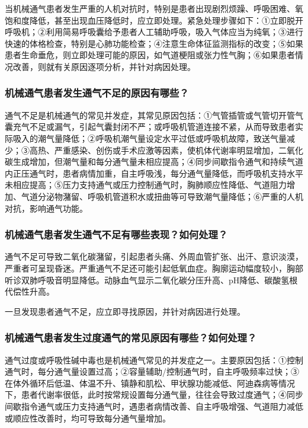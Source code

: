 当机械通气患者发生严重的人机对抗时，特别是患者出现剧烈烦躁、呼吸困难、氧饱和度降低，甚至出现血压降低时，应立即处理。紧急处理步骤如下：①立即脱开呼吸机；②利用简易呼吸囊给予患者人工辅助呼吸，吸入气体应当为纯氧；③进行快速的体格检查，特别是心肺功能检查；④注意生命体征监测指标的改变；⑤如果患者生命垂危，则立即处理可能的原因，如气道梗阻或张力性气胸；⑥如果患者情况改善，则就有关原因逐项分析，并针对病因处理。

\subsubsection{机械通气患者发生通气不足的原因有哪些？}

通气不足是机械通气的常见并发症，其常见原因包括：①气管插管或气管切开管气囊充气不足或漏气，引起气囊封闭不严；或呼吸机管道连接不紧，从而导致患者实际吸入的潮气量降低；②呼吸机潮气量设定水平过低或呼吸机故障，致送气量减少；③高热、严重感染、创伤或手术应激等因素，使机体代谢率明显增加，二氧化碳生成增加，但潮气量和每分通气量未相应提高；④同步间歇指令通气和持续气道内正压通气时，患者病情加重，自主呼吸浅，每分通气量降低，而呼吸机支持水平未相应提高；⑤压力支持通气或压力控制通气时，胸肺顺应性降低、气道阻力增加、气道分泌物潴留、呼吸机管道积水或扭曲等可导致潮气量降低；⑥严重的人机对抗，影响通气功能。

\subsubsection{机械通气患者发生通气不足有哪些表现？如何处理？}

通气不足可导致二氧化碳潴留，引起患者头痛、外周血管扩张、出汗、意识淡漠，严重者可呈现昏迷。严重通气不足还可能引起低氧血症。胸廓运动幅度较小，胸部听诊双肺呼吸音明显降低。动脉血气显示二氧化碳分压升高、pH降低、碳酸氢根代偿性升高。

一旦发现患者通气不足，应立即寻找原因，并针对病因进行处理。

\subsubsection{机械通气患者发生过度通气的常见原因有哪些？如何处理？}

通气过度或呼吸性碱中毒也是机械通气常见的并发症之一。主要原因包括：①控制通气时，每分通气量设置过高；②容量辅助/控制通气时，自主呼吸频率过快；③在体外循环后低温、体温不升、镇静和肌松、甲状腺功能减低、阿迪森病等情况下，患者代谢率很低，此时按常规设置每分通气量，往往会导致过度通气；④同步间歇指令通气或压力支持通气时，遇患者病情改善、自主呼吸增强、气道阻力减低或顺应性改善时，均可导致每分通气量增加。

